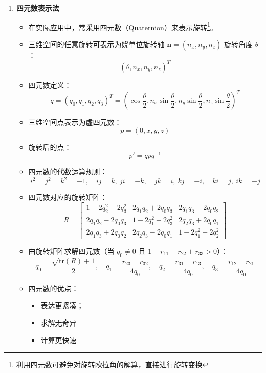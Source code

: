 \documentclass[../main.tex]{subfiles}
\begin{document}
\begin{enumerate}
    \item \textbf{四元数表示法}
    \begin{itemize}
        \item 在实际应用中，常采用四元数（Quaternion）来表示旋转\footnote{利用四元数可避免对旋转欧拉角的解算，直接进行旋转变换}。
        \item 三维空间的任意旋转可表示为绕单位旋转轴 $\mathbf{n} = (n_x, n_y, n_z)$ 旋转角度 $\theta$：
        \[
        (\theta, n_x, n_y, n_z)^T
        \]
        \item 四元数定义：
        \[
        q = (q_0, q_1, q_2, q_3)^T = 
        (\cos\frac{\theta}{2}, n_x\sin\frac{\theta}{2}, n_y\sin\frac{\theta}{2}, n_z\sin\frac{\theta}{2})^T
        \]
        \item 三维空间点表示为虚四元数：
        \[
        p = (0, x, y, z)
        \]
        \item 旋转后的点：
        \[
        p' = q p q^{-1}
        \]
        \item 四元数的代数运算规则：
        \[
        i^2 = j^2 = k^2 = -1,\quad
        ij = k, \ ji = -k,\quad
        jk = i, \ kj = -i,\quad
        ki = j, \ ik = -j
        \]
        \item 四元数对应的旋转矩阵：
        \[
        R = \begin{bmatrix}
            1 - 2q_2^2 - 2q_3^2 & 2q_1q_2 + 2q_0q_3 & 2q_1q_3 - 2q_0q_2 \\
            2q_1q_2 - 2q_0q_3 & 1 - 2q_1^2 - 2q_3^2 & 2q_2q_3 + 2q_0q_1 \\
            2q_1q_3 + 2q_0q_2 & 2q_2q_3 - 2q_0q_1 & 1 - 2q_1^2 - 2q_2^2
        \end{bmatrix}
        \]
        \item 由旋转矩阵求解四元数（当 $q_0 \neq 0$ 且 $1 + r_{11} + r_{22} + r_{33} > 0$）：
        \[
        q_0 = \frac{\sqrt{\mathrm{tr}(R) + 1}}{2}, \quad
        q_1 = \frac{r_{23} - r_{32}}{4q_0}, \quad
        q_2 = \frac{r_{31} - r_{13}}{4q_0}, \quad
        q_3 = \frac{r_{12} - r_{21}}{4q_0}
        \]
        \item 四元数的优点：
        \begin{itemize}
            \item 表达更紧凑；
            \item 求解无奇异
            \item 计算更快速
        \end{itemize}
    \end{itemize}

\end{enumerate}
\end{document}
